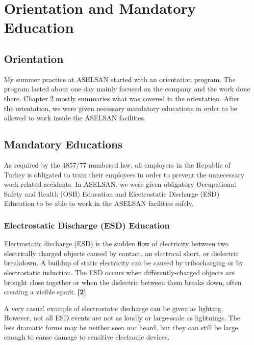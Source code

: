 \vfill

\section{Orientation and Mandatory Education}

\subsection{Orientation}
\- \indent
	My summer practice at ASELSAN started with an orientation program. The program lasted about one day mainly focused on the company and the work done there. Chapter 2 mostly summaries what was covered in the orientation. After the orientation, we were given necessary mandatory educations in order to be allowed to work inside the ASELSAN facilities.  

\subsection{Mandatory Educations}
\- \indent
	As required by the 4857/77  numbered law, all employers in the Republic of Turkey is obligated to train their employees in order to prevent the unnecessary work related accidents. In ASELSAN, we were given obligatory Occupational Safety and Health (OSH) Education and Electrostatic Discharge (ESD) Education to be able to work in the ASELSAN facilities safely.
	
	
	
\subsubsection{Electrostatic Discharge (ESD) Education }
\- \indent

	Electrostatic discharge (ESD) is the sudden flow of electricity between two electrically charged objects caused by contact, an electrical short, or dielectric breakdown. A buildup of static electricity can be caused by tribocharging or by electrostatic induction. The ESD occurs when differently-charged objects are brought close together or when the dielectric between them breaks down, often creating a visible spark. \textbf{[2]}

	A very casual example of electrostatic discharge can be given as lighting. However, not all ESD events are not as loudly or large-scale as lightnings. The less dramatic forms  may be neither seen nor heard, but they can still be large enough to cause damage to sensitive electronic devices. 


